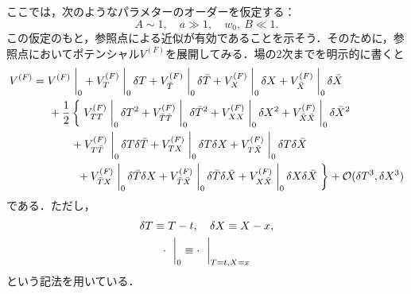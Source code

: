\documentclass[a4paper,uplatex,dvipdfmx,10pt]{jsarticle}
\theoremstyle{definition}
\begin{document}
ここでは，次のようなパラメターのオーダーを仮定する：
\begin{equation}
   A\sim 1
   ,\quad
   a\gg 1
   ,\quad 
   w_0,\ B\ll 1
   .
   \label{assumption_parameter_Polonyi-KKLT}
\end{equation}
この仮定のもと，参照点による近似が有効であることを示そう．そのために，参照点においてポテンシャル$V^{(F)}$を展開してみる．場の2次までを明示的に書くと
\begin{align}
   V^{(F)}
   &=
   V^{(F)}
   \left.\vphantom{\frac{1}{2}}\right|_{0}
   +
   V^{(F)}_{T}
   \left.\vphantom{\frac{1}{2}}\right|_{0} 
   \delta T
   +
   V^{(F)}_{\bar{T}}
   \left.\vphantom{\frac{1}{2}}\right|_{0} 
   \delta \bar{T}
   +
   V^{(F)}_{X}
   \left.\vphantom{\frac{1}{2}}\right|_{0} 
   \delta X
   +
   V^{(F)}_{\bar{X}}
   \left.\vphantom{\frac{1}{2}}\right|_{0} 
   \delta \bar{X}
   \nonumber
   \\
   &\hspace*{0.5cm}
   +
   \frac{1}{2}
   \left\{\vphantom{\frac{1}{2}}\right.
   V^{(F)}_{TT}
   \left.\vphantom{\frac{1}{2}}\right|_{0} 
   \delta T^2
   +
   V^{(F)}_{\bar{T}\bar{T}}
   \left.\vphantom{\frac{1}{2}}\right|_{0} 
   \delta \bar{T}^2
   +
   V^{(F)}_{XX}
   \left.\vphantom{\frac{1}{2}}\right|_{0} 
   \delta X^2
   +
   V^{(F)}_{\bar{X}\bar{X}}
   \left.\vphantom{\frac{1}{2}}\right|_{0} 
   \delta \bar{X}^2
   \nonumber
   \\
   &\hspace*{1.2cm}
   +
   V^{(F)}_{T\bar{T}}
   \left.\vphantom{\frac{1}{2}}\right|_{0} 
   \delta T\delta \bar{T}
   +
   V^{(F)}_{TX}
   \left.\vphantom{\frac{1}{2}}\right|_{0} 
   \delta T\delta X
   +
   V^{(F)}_{T\bar{X}}
   \left.\vphantom{\frac{1}{2}}\right|_{0} 
   \delta T\delta \bar{X}
   \nonumber
   \\
   &\hspace*{1.4cm}
   +
   V^{(F)}_{\bar{T}X}
   \left.\vphantom{\frac{1}{2}}\right|_{0} 
   \delta \bar{T}\delta X
   +
   V^{(F)}_{\bar{T}\bar{X}}
   \left.\vphantom{\frac{1}{2}}\right|_{0} 
   \delta \bar{T}\delta \bar{X}
   +
   V^{(F)}_{X\bar{X}}
   \left.\vphantom{\frac{1}{2}}\right|_{0} 
   \delta X\delta \bar{X}
   \left.\vphantom{\frac{1}{2}}\right\}
   +
   \mathcal{O}(\delta T^3,\delta X^3)
   \label{expansion_F-term}
\end{align}
である．ただし，
\begin{gather}
   \delta T
   \equiv
   T-t
   ,\quad
   \delta X
   \equiv
   X-x
   ,
   \nonumber
   \\
   \cdot\ 
   \left.\vphantom{\frac{1}{2}}\right|_{0}
   \equiv
   \cdot\ 
   \left.\vphantom{\frac{1}{2}}\right|_{T=t,X=x}
   \nonumber
\end{gather}
という記法を用いている．
\end{document}
